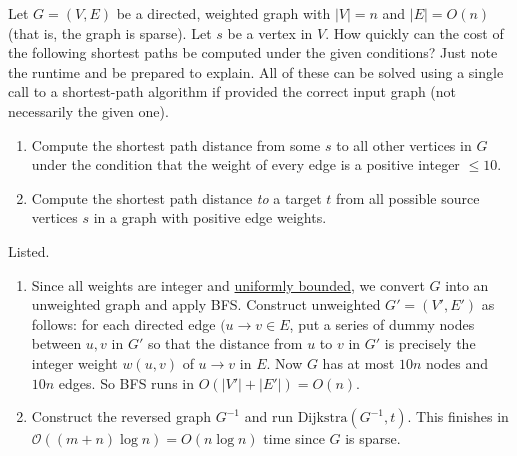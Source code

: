   \begin{exercise}
    Let  $G=(V, E)$ be a directed, weighted graph with $|V|= n$ and $|E|=O(n)$ (that is, the graph is sparse). Let $s$ be a vertex in $V$. How quickly can the cost of the following shortest paths be computed under the given conditions? Just note the runtime and be prepared to explain. All of these can be solved using a single call to a shortest-path algorithm if provided the correct input graph (not necessarily the given one).
    \begin{enumerate}
      \item Compute the shortest path distance from some $s$ to all other vertices in $G$ under the condition that the weight of every edge is a positive integer $\le  10$.
      \item Compute the shortest path distance \textit{to} a target $t$ from all possible source vertices $s$ in a graph with positive edge weights.
    \end{enumerate}
  \end{exercise}
  \begin{solution}
    Listed. 
    \begin{enumerate}
      \item Since all weights are integer and \hyperref[real-def:uniformly-bounded]{uniformly bounded}, we convert $G$ into an unweighted graph and apply BFS. Construct unweighted $G'=(V', E')$ as follows: for each directed edge $(u\to v \in E$, put a series of dummy nodes between $u,v$ in $G'$ so that the distance from $u$ to $v$ in $G'$ is precisely the integer weight $w(u,v)$ of $u\to v$ in $E$. Now $G$ has at most $10n$ nodes and $10n$ edges. So BFS runs in $O(\lvert V'\rvert  + \lvert E'\rvert ) = O(n)$.
      \item Construct the reversed graph $G^{-1}$ and run $\mathrm{Dijkstra}(G^{-1}, t)$. This finishes in $\mathcal{O}((m+n) \log n) = O(n\log n)$ time since $G$ is sparse.
    \end{enumerate}
  \end{solution}

